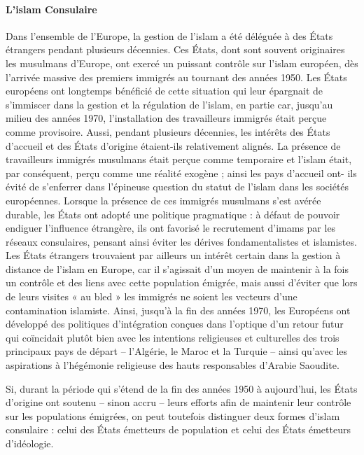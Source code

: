 \paragraph{L'islam Consulaire}


Dans l'ensemble de l'Europe, la gestion de l'islam a été déléguée à des
États étrangers pendant plusieurs décennies. Ces États, dont sont
souvent originaires les musulmans d'Europe, ont exercé un puissant
contrôle sur l'islam européen, dès l'arrivée massive des premiers
immigrés au tournant des années 1950. Les États européens ont longtemps
bénéficié de cette situation qui leur épargnait de s'immiscer dans la
gestion et la régulation de l'islam, en partie car, jusqu'au milieu des
années 1970, l'installation des travailleurs immigrés était perçue comme
provisoire. Aussi, pendant plusieurs décennies, les intérêts des États
d'accueil et des États d'origine étaient-ils relativement alignés. La
présence de travailleurs immigrés musulmans était perçue comme
temporaire et l'islam était, par conséquent, perçu comme une réalité
exogène ; ainsi les pays d'accueil ont- ils évité de s'enferrer dans
l'épineuse question du statut de l'islam dans les sociétés européennes.
Lorsque la présence de ces immigrés musulmans s'est avérée durable, les
États ont adopté une politique pragmatique : à défaut de pouvoir
endiguer l'influence 
étrangère, ils ont favorisé le recrutement d'imams par les réseaux
consulaires, pensant ainsi éviter les dérives fondamentalistes et
islamistes. Les États étrangers trouvaient par ailleurs un intérêt
certain dans la gestion à distance de l'islam en Europe, car il
s'agissait d'un moyen de maintenir à la fois un contrôle et des liens
avec cette population émigrée, mais aussi d'éviter que lors de leurs
visites « au bled » les immigrés ne soient les vecteurs d'une
contamination islamiste. Ainsi, jusqu'à la fin des années 1970, les
Européens ont développé des politiques d'intégration conçues dans
l'optique d'un retour futur qui coïncidait plutôt bien avec les
intentions religieuses et culturelles des trois principaux pays de
départ -- l'Algérie, le Maroc et la Turquie -- ainsi qu'avec les
aspirations à l'hégémonie religieuse des hauts responsables d'Arabie
Saoudite.

Si, durant la période qui s'étend de la fin des années 1950 à
aujourd'hui, les États d'origine ont soutenu -- sinon accru -- leurs
efforts afin de maintenir leur contrôle sur les populations émigrées, on
peut toutefois distinguer deux formes d'islam consulaire : celui des
États émetteurs de population et celui des États émetteurs d'idéologie.



